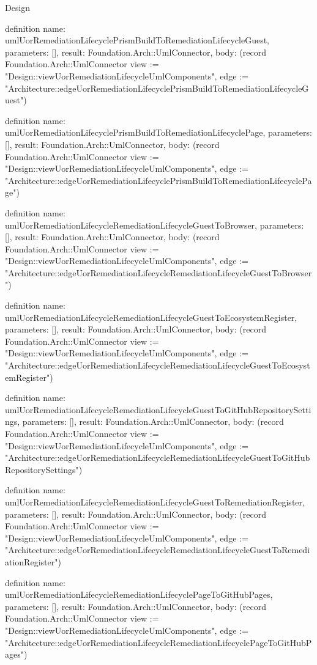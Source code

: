 \begin{lexlean}{Design}
\begin{semanticmodule}
definition{
  name: umlUorRemediationLifecyclePrismBuildToRemediationLifecycleGuest,
  parameters: [],
  result: Foundation.Arch::UmlConnector,
  body: (record Foundation.Arch::UmlConnector {view := "Design::viewUorRemediationLifecycleUmlComponents", edge := "Architecture::edgeUorRemediationLifecyclePrismBuildToRemediationLifecycleGuest"})
}

definition{
  name: umlUorRemediationLifecyclePrismBuildToRemediationLifecyclePage,
  parameters: [],
  result: Foundation.Arch::UmlConnector,
  body: (record Foundation.Arch::UmlConnector {view := "Design::viewUorRemediationLifecycleUmlComponents", edge := "Architecture::edgeUorRemediationLifecyclePrismBuildToRemediationLifecyclePage"})
}

definition{
  name: umlUorRemediationLifecycleRemediationLifecycleGuestToBrowser,
  parameters: [],
  result: Foundation.Arch::UmlConnector,
  body: (record Foundation.Arch::UmlConnector {view := "Design::viewUorRemediationLifecycleUmlComponents", edge := "Architecture::edgeUorRemediationLifecycleRemediationLifecycleGuestToBrowser"})
}

definition{
  name: umlUorRemediationLifecycleRemediationLifecycleGuestToEcosystemRegister,
  parameters: [],
  result: Foundation.Arch::UmlConnector,
  body: (record Foundation.Arch::UmlConnector {view := "Design::viewUorRemediationLifecycleUmlComponents", edge := "Architecture::edgeUorRemediationLifecycleRemediationLifecycleGuestToEcosystemRegister"})
}

definition{
  name: umlUorRemediationLifecycleRemediationLifecycleGuestToGitHubRepositorySettings,
  parameters: [],
  result: Foundation.Arch::UmlConnector,
  body: (record Foundation.Arch::UmlConnector {view := "Design::viewUorRemediationLifecycleUmlComponents", edge := "Architecture::edgeUorRemediationLifecycleRemediationLifecycleGuestToGitHubRepositorySettings"})
}

definition{
  name: umlUorRemediationLifecycleRemediationLifecycleGuestToRemediationRegister,
  parameters: [],
  result: Foundation.Arch::UmlConnector,
  body: (record Foundation.Arch::UmlConnector {view := "Design::viewUorRemediationLifecycleUmlComponents", edge := "Architecture::edgeUorRemediationLifecycleRemediationLifecycleGuestToRemediationRegister"})
}

definition{
  name: umlUorRemediationLifecycleRemediationLifecyclePageToGitHubPages,
  parameters: [],
  result: Foundation.Arch::UmlConnector,
  body: (record Foundation.Arch::UmlConnector {view := "Design::viewUorRemediationLifecycleUmlComponents", edge := "Architecture::edgeUorRemediationLifecycleRemediationLifecyclePageToGitHubPages"})
}


\end{semanticmodule}
\end{lexlean}
